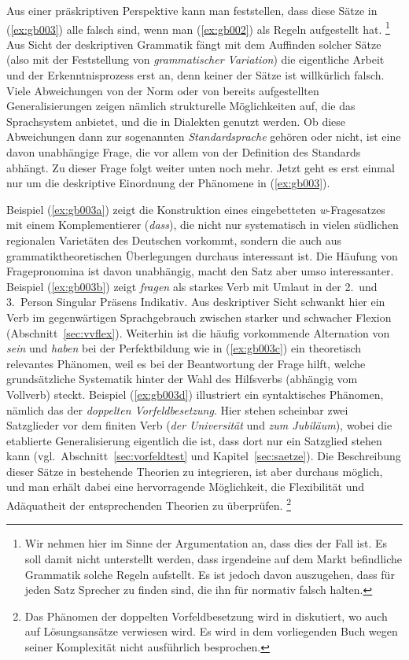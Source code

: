 Aus einer präskriptiven Perspektive kann man feststellen, dass diese Sätze in (\ref{ex:gb003}) alle falsch sind, wenn man (\ref{ex:gb002}) als Regeln aufgestellt hat.%
\footnote{Wir nehmen hier im Sinne der Argumentation an, dass dies der Fall ist.
Es soll damit nicht unterstellt werden, dass irgendeine auf dem Markt befindliche Grammatik solche Regeln aufstellt.
Es ist jedoch davon auszugehen, dass für jeden Satz Sprecher zu finden sind, die ihn für normativ falsch halten.}
Aus Sicht der deskriptiven Grammatik fängt mit dem Auffinden solcher Sätze (also mit der Feststellung von \textit{grammatischer Variation}) die eigentliche Arbeit und der Erkenntnisprozess erst an, denn keiner der Sätze ist willkürlich falsch.
Viele Abweichungen von der Norm oder von bereits aufgestellten Generalisierungen zeigen nämlich strukturelle Möglichkeiten auf, die das Sprachsystem anbietet, und die \zB in Dialekten genutzt werden.
Ob diese Abweichungen dann zur sogenannten \textit{Standardsprache} gehören oder nicht, ist eine davon unabhängige Frage, die vor allem von der Definition des Standards abhängt.
Zu dieser Frage folgt weiter unten noch mehr.
Jetzt geht es erst einmal nur um die deskriptive Einordnung der Phänomene in (\ref{ex:gb003}).

Beispiel (\ref{ex:gb003a}) zeigt die Konstruktion eines eingebetteten \textit{w}-Fragesatzes mit einem Komplementierer (\textit{dass}), die nicht nur systematisch in vielen südlichen regionalen Varietäten des Deutschen vorkommt, sondern die auch aus grammatiktheoretischen Überlegungen durchaus interessant ist.
Die Häufung von Fragepronomina ist davon unabhängig, macht den Satz aber umso interessanter.
Beispiel (\ref{ex:gb003b}) zeigt \textit{fragen} als starkes Verb mit Umlaut in der 2.\ und 3.\ Person Singular Präsens Indikativ.
Aus deskriptiver Sicht schwankt hier ein Verb im gegenwärtigen Sprachgebrauch zwischen starker und schwacher Flexion (Abschnitt~\ref{sec:vvflex}).
Weiterhin ist die häufig vorkommende Alternation von \textit{sein} und \textit{haben} bei der Perfektbildung wie in (\ref{ex:gb003c}) ein theoretisch relevantes Phänomen, weil es bei der Beantwortung der Frage hilft, welche grundsätzliche Systematik hinter der Wahl des Hilfsverbs (abhängig vom Vollverb) steckt.
Beispiel (\ref{ex:gb003d}) illustriert ein syntaktisches Phänomen, nämlich das der \textit{doppelten Vorfeldbesetzung}.
Hier stehen scheinbar zwei Satzglieder vor dem finiten Verb (\textit{der Universität} und \textit{zum Jubiläum}), wobei die etablierte Generalisierung eigentlich die ist, dass dort nur ein Satzglied stehen kann (vgl.\ Abschnitt~\ref{sec:vorfeldtest} und Kapitel~\ref{sec:saetze}).
Die Beschreibung dieser Sätze in bestehende Theorien zu integrieren, ist aber durchaus möglich, und man erhält dabei eine hervorragende Möglichkeit, die Flexibilität und Adäquatheit der entsprechenden Theorien zu überprüfen.%
\footnote{Das Phänomen der doppelten Vorfeldbesetzung wird in \citet{Mueller03} diskutiert, wo auch auf Lösungsansätze verwiesen wird.
Es wird in dem vorliegenden Buch wegen seiner Komplexität nicht ausführlich besprochen.}

